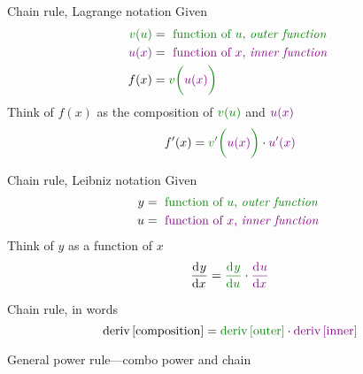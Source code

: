 
\begin{FormulaBox}{Chain rule, Lagrange notation}
 Given
 \begin{equation*}
  \begin{split}
    \OuterStyle{v(u)} &= \text{ \OuterStyle{function of $u$, \emph{outer function}} }
    \\
    \InnerStyle{u(x)} &= \text{ \InnerStyle{function of $x$, \emph{inner function}} }
    \\
    f(x) &= \OuterStyle{v\bigg(\InnerStyle{u(x)}\bigg)}
    \\
  \end{split}
 \end{equation*}
 Think of $f(x)$ as the composition of $\OuterStyle{v(u)}$ and $\InnerStyle{u(x)}$
 \begin{equation*}
  f'(x) = \OuterStyle{v'\bigg(\InnerStyle{u(x)}\bigg)}
  \cdot
  \InnerStyle{u'(x)}
 \end{equation*}
\end{FormulaBox}

\begin{FormulaBox}{Chain rule, Leibniz notation}
 Given
 \begin{equation*}
  \begin{split}
    y &= \text{ \OuterStyle{function of $u$, \emph{outer function}} }
    \\
    u &= \text{ \InnerStyle{function of $x$, \emph{inner function}} }
    \\
  \end{split}
 \end{equation*}
 Think of $y$ as a function of $x$
 \begin{equation*}
  \Deriv{y}{x} =
  \OuterStyle{\Deriv{y}{u}}
  \cdot
  \InnerStyle{\Deriv{u}{x}}
 \end{equation*}
\end{FormulaBox}

\begin{FormulaBox}{Chain rule, in words}
 \begin{equation*}
  \DerivWord{\Word{composition}}
  =
  \OuterStyle{\DerivWord{\Word{outer}}}\cdot\InnerStyle{\DerivWord{\Word{inner}}}
 \end{equation*}
\end{FormulaBox}

\begin{FormulaBox}{General power rule---combo power and chain}
\end{FormulaBox}

